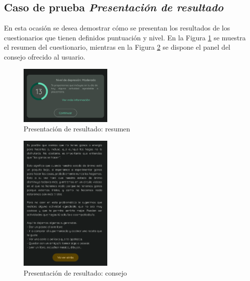             \clearpage  %
            
        \subsection*{Caso de prueba \textit{Presentación de resultado}}
            En esta ocasión se desea demostrar cómo se presentan los resultados de los cuestionarios que tienen definidos puntuación y nivel. En la Figura \ref{figure:pruebas:presentacion_resultado:resumen} se muestra el resumen del cuestionario, mientras en la Figura \ref{figure:pruebas:presentacion_resultado:consejo} se dispone el panel del consejo ofrecido al usuario.

            \begin{figure}[h]
                \centering
                \includegraphics[width=0.4\textwidth]{figures/pruebas/presentacion_resultado/Resultado.png}
                \caption{Presentación de resultado: resumen}
                \label{figure:pruebas:presentacion_resultado:resumen}
            \end{figure}

            \begin{figure}[h]
                \centering
                \includegraphics[width=0.4\textwidth]{figures/pruebas/presentacion_resultado/Consejo.png}
                \caption{Presentación de resultado: consejo}
                \label{figure:pruebas:presentacion_resultado:consejo}
            \end{figure}

